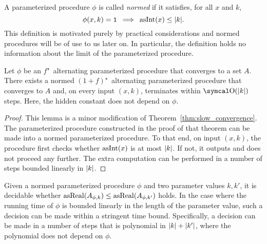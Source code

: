 A parameterized procedure $\phi$ is called \emph{normed} \parencite{ambos-spies2000weakly} if it satisfies, for all $x$ and $k$,
\begin{equation*}
  \phi(x, k) = \textnormal{\texttt{1}} \:\implies\: \operatorname{asInt}(x) \le {\lvert k\rvert}.
\end{equation*}
This definition is motivated purely by practical considerations and normed procedures will be of use to us later on.
In particular, the definition holds no information about the limit of the parameterized procedure.
\begin{lemma}
\label{lem:slow_convergence_normed}%
  Let $\phi$ be an $f$"~alternating parameterized procedure that converges to a set $A$.
  There exists a normed $(1 + f)$"~alternating parameterized procedure that converges to $A$ and, on every input $(x, k)$, terminates within $\bigO(\length{k})$ steps.
  Here, the hidden constant does not depend on $\phi$.
\end{lemma}
\begin{proof}
  This lemma is a minor modification of Theorem~\ref{thm:slow_convergence}.
  The parameterized procedure constructed in the proof of that theorem can be made into a normed parameterized procedure.
  To that end, on input $(x, k)$, the procedure first checks whether $\operatorname{asInt}(x)$ is at most ${\lvert k\rvert}$.
  If not, it outputs  and does not proceed any further.
  The extra computation can be performed in a number of steps bounded linearly in ${\lvert k\rvert}$.
\end{proof}

Given a normed parameterized procedure $\phi$ and two parameter values $k, k'$, it is decidable whether $\operatorname{asReal}(A_{\phi, k}) \le \operatorname{asReal}(A_{\phi, k'})$ holds.
In the case where the running time of $\phi$ is bounded linearly in the length of the parameter value, such a decision can be made within a stringent time bound.
Specifically, a decision can be made in a number of steps that is polynomial in ${\lvert k\rvert} + {\lvert k'\rvert}$, where the polynomial does not depend on $\phi$.

